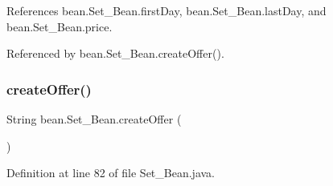 References bean.\+Set\+\_\+\+Bean.\+first\+Day, bean.\+Set\+\_\+\+Bean.\+last\+Day, and bean.\+Set\+\_\+\+Bean.\+price.



Referenced by bean.\+Set\+\_\+\+Bean.\+create\+Offer().

\mbox{\label{classbean_1_1Set__Bean_a465bd2dc79465be5933720eadd23d137}} 
\subsubsection{\texorpdfstring{createOffer()}{createOffer()}}
{\footnotesize\ttfamily String bean.\+Set\+\_\+\+Bean.\+create\+Offer (\begin{DoxyParamCaption}{ }\end{DoxyParamCaption})}



Definition at line 82 of file Set\+\_\+\+Bean.\+java.


